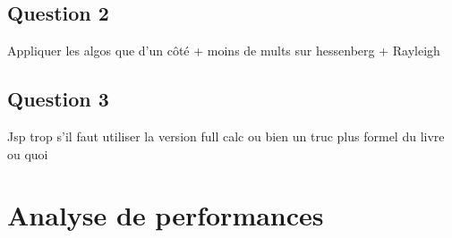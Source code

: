 \documentclass[11pt]{article}
\begin{document}
\subsection*{Question 2}
Appliquer les algos que d'un côté + moins de mults sur hessenberg + Rayleigh

\subsection*{Question 3}
Jsp trop s'il faut utiliser la version full calc ou bien un truc plus formel du livre ou quoi

\section*{Analyse de performances}
\end{document}
